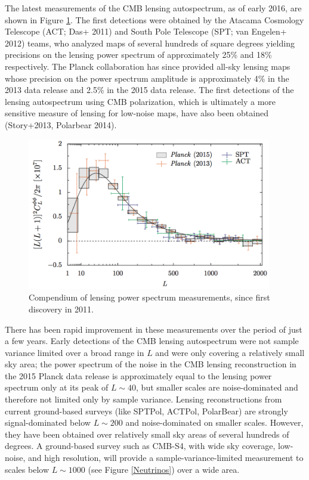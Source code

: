 The latest measurements of the CMB lensing autospectrum, as of early 2016, are shown in Figure \ref{CMBLensPower}. The first detections were obtained by the Atacama Cosmology Telescope (ACT; Das+ 2011) and South Pole Telescope  (SPT; van Engelen+ 2012) teams, who analyzed maps of several hundreds of square degrees yielding precisions on the lensing power spectrum of approximately 25\% and 18\% respectively.  The Planck collaboration has since provided all-sky lensing maps whose precision on the power spectrum amplitude is approximately 4\% in the 2013 data release and 2.5\% in the 2015 data release.  The first detections of the lensing autospectrum using CMB polarization, which is ultimately a more sensitive measure of lensing for low-noise maps,  have also been obtained (Story+2013, Polarbear 2014).

\begin{figure}[h]
\centering
\includegraphics[width=0.95\textwidth]{CMBLensing/CMBLensPower.png}
\caption{Compendium of lensing power spectrum measurements, since first discovery in 2011.  }
\label{CMBLensPower}
\end{figure}

There has been rapid improvement in these measurements over the period of just a few years. 
Early detections of the CMB lensing autospectrum were not sample variance limited over a broad range in $L$ and were only covering a relatively small sky area;  
the  power spectrum of the noise in the CMB lensing reconstruction  in the 2015 Planck data release is approximately equal to the lensing power spectrum only at its peak of $L \sim 40$, but smaller scales are noise-dominated and therefore not limited only by sample variance.  Lensing reconstructions from current ground-based surveys (like SPTPol, ACTPol, PolarBear) 
are strongly signal-dominated below $L \sim 200$ and noise-dominated on smaller scales.  However, they have been obtained over relatively small sky areas of several hundreds of degrees. A ground-based survey such as CMB-S4, with wide sky coverage, low-noise, and high resolution, will provide a sample-variance-limited measurement to scales below $L \sim 1000$ (see Figure \ref{Neutrinos}) over a wide area.  
 


